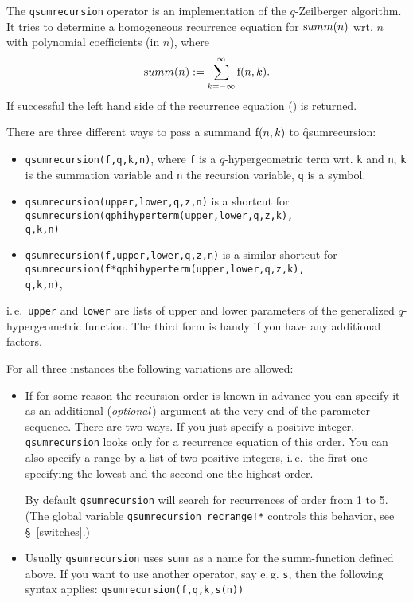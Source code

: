 The \texttt{qsumrecursion} operator is an implementation of the
$q$-Zeilberger algorithm.
It tries to determine a homogeneous recurrence equation for
${\mathrm summ}(n)$ wrt. $n$ with polynomial coefficients (in $n$), where
%
\[
	{\mathrm summ}(n):= \sum_{k=-\infty}^{\infty}{{\mathrm f}(n,k)}.
\]
%
If successful the left hand side of the recurrence equation
() is returned.

There are three different ways to pass a summand ${\mathrm f}(n,k)$
to \f{qsumrecursion}:
%
\begin{itemize}
	\item \texttt{qsumrecursion(f,q,k,n)}, where \texttt{f} is a
		$q$-hypergeometric term wrt. \texttt{k} and \texttt{n},
		\texttt{k} is the summation variable and \texttt{n} the recursion
		variable, \texttt{q} is a symbol.
	\item \texttt{qsumrecursion(upper,lower,q,z,n)} is a shortcut for \\
          \texttt{qsumrecursion(qphihyperterm(upper,lower,q,z,k),\\
                 \hspace*{3cm} q,k,n)}
	\item \texttt{qsumrecursion(f,upper,lower,q,z,n)} is a similar
		shortcut for\\
		\texttt{qsumrecursion(f*qphihyperterm(upper,lower,q,z,k),\\
                  \hspace*{3cm} q,k,n)},
\end{itemize}
%
i.\,e.\ \texttt{upper} and \texttt{lower} are lists of upper and lower
parameters of the generalized $q$-hypergeometric function.
The third form is handy if you have any additional factors.

For all three instances the following variations are allowed:
\begin{itemize}
	\item If for some reason the recursion order is known in
		advance you can specify it as an additional (\textsl{optional}\,)
		argument at the very end of the parameter sequence. There are two
		ways. If you just specify a positive integer,
		\texttt{qsumrecursion} looks only for a recurrence equation of this order.
		You can also specify a range by a list of two positive integers,
		i.\,e.\ the first one specifying the lowest and the second one the
		highest order.

		By default \texttt{qsumrecursion} will search for recurrences
		of order from 1 to 5. (The global variable
		\texttt{qsumrecursion\_recrange!*} controls this behavior,
		see \S~\ref{switches}.)
	\item Usually \texttt{qsumrecursion} uses \texttt{summ} as a name
		for the $\mathrm{summ}$-function defined above. If you want
		to use another operator, say e.\,g. \texttt{s}, then the
		following syntax applies: \texttt{qsumrecursion(f,q,k,s(n))}
\end{itemize}

